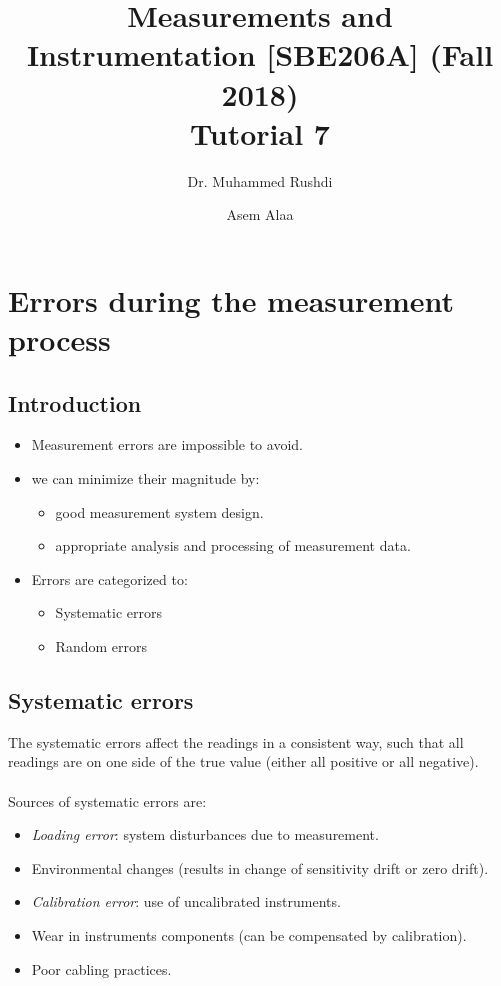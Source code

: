 \documentclass[a4paper,11pt]{book}
\begin{document}
\author{Dr. Muhammed Rushdi \and Asem Alaa}

\title{Measurements and Instrumentation [SBE206A] (Fall 2018)\\ Tutorial 7}

\maketitle


\chapter*{Errors during the measurement process}

\section*{Introduction}
\begin{itemize}
\item Measurement errors are impossible to avoid.
\item we can minimize their magnitude by: 
\begin{itemize}
\item good measurement system design.
\item appropriate analysis and processing of measurement data.
\end{itemize} 
\item Errors are categorized to:
\begin{itemize}
\item Systematic errors
\item Random errors
\end{itemize}
\end{itemize}

\section*{Systematic errors}

The systematic errors affect the readings in a consistent way, such that all readings are on one side of the true value (either all positive or all negative).\\
\\
Sources of systematic errors are:
\begin{itemize}
\item \emph{Loading error}: system disturbances due to measurement.
\item Environmental changes (results in change of sensitivity drift or zero drift).
\item \emph{Calibration error}: use of uncalibrated instruments.
\item Wear in instruments components (can be compensated by calibration).
\item Poor cabling practices.
\end{itemize}
\end{document}
